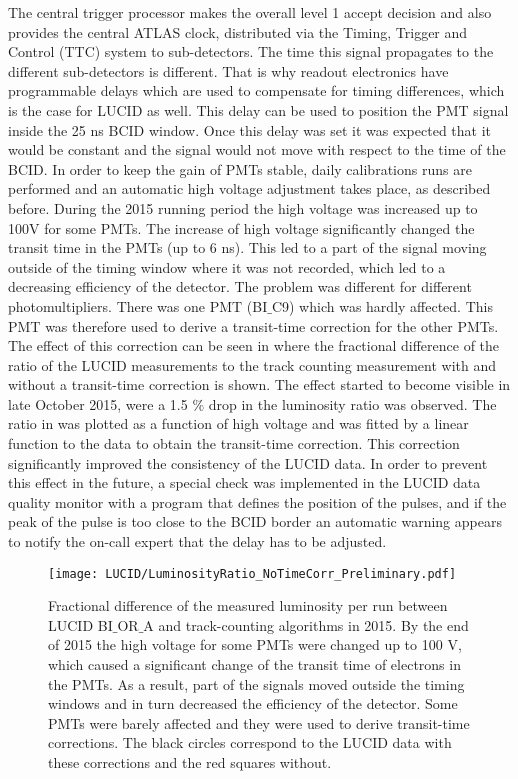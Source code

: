 The central trigger processor makes the overall level 1 accept decision and also provides the central ATLAS clock, distributed via the Timing, Trigger and Control (TTC) system to sub-detectors. 
The time this signal propagates to the different sub-detectors is different. 
That is why readout electronics have programmable delays which are used to compensate for timing differences, which is the case for LUCID as well. 
This delay can be used to position the PMT signal inside the 25 ns BCID window. 
Once this delay was set it was expected that it would be constant and the signal would not move with respect to the time of the BCID. 
In order to keep the gain of PMTs stable, daily calibrations runs are performed and an automatic high voltage adjustment takes place, as described before. 
During the 2015 running period the high voltage was increased up to 100V for some PMTs.
The increase of high voltage significantly changed the transit time in the PMTs (up to 6 ns). 
This led to a part of the signal moving outside of the timing window where it was not recorded, which led to a decreasing efficiency of the detector.
The problem was different for different photomultipliers. There was one PMT (BI$\_$C9) which was hardly affected. 
This PMT was therefore used to derive a transit-time correction for the other PMTs.
The effect of this correction can be seen in  where the fractional difference of the ratio of the LUCID measurements to the track counting measurement with and without a transit-time correction is shown.
The effect started to become visible in late October 2015, were a 1.5 $\%$ drop in the luminosity ratio was observed.
The ratio in  was plotted as a function of high voltage and was fitted by a linear function to the data to obtain the transit-time correction.
This correction significantly improved the consistency of the LUCID data. 
In order to prevent this effect in the future, a special check was implemented in the LUCID data quality monitor
with a program that defines the position of the pulses, 
and if the peak of the pulse is too close to the BCID border an automatic warning appears to notify the on-call expert that the delay has to be adjusted.

\begin{figure}
\centering
\texttt{[image: LUCID/LuminosityRatio\_NoTimeCorr\_Preliminary.pdf]}
\caption{ 
Fractional difference of the measured luminosity per run between LUCID BI$\_$OR$\_$A and track-counting algorithms in 2015.
By the end of 2015 the high voltage for some PMTs were changed up to 100 V, which caused a significant change of the transit time of electrons in the PMTs.
As a result, part of the signals moved outside the timing windows and in turn decreased the efficiency of the detector.
Some PMTs were barely affected and they were used to derive transit-time corrections.
The black circles correspond to the LUCID data with these corrections and the red squares without.
}
\label{fig:transitTime}
\end{figure}


